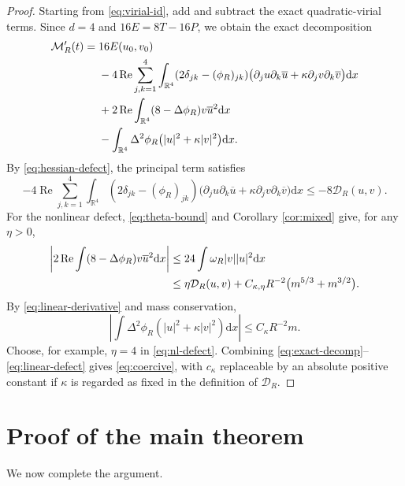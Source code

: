 \documentclass[10pt,a4paper]{amsart}
\numberwithin{equation}{section}
\newcommand{\R}{\mathbb{R}}
\newcommand{\dd}{\mathrm{d}x}
\newcommand{\re}{\operatorname{Re}}
\begin{document}
\begin{proof}
Starting from \eqref{eq:virial-id}, add and subtract the exact quadratic-virial terms.  Since $d=4$ and $16E=8T-16P$, we obtain the exact decomposition
\begin{align}
 \mathcal M_R'(t)
 ={}&16E(u_0,v_0)\label{eq:exact-decomp}\\
 &-4\re\sum_{j,k=1}^4\int_{\R^4}
 (2\delta_{jk}-(\phi_R)_{jk})
 \big(\partial_ju\partial_k\overline u+\kappa\partial_jv\partial_k\overline v\big)\dd\notag\\
 &+2\re\int_{\R^4}(8-\Delta\phi_R)v\overline u^{2}\dd\notag\\
 &-\int_{\R^4}\Delta^2\phi_R\big(|u|^2+\kappa|v|^2\big)\dd.\notag
\end{align}
By \eqref{eq:hessian-defect}, the principal term satisfies
\begin{equation}\label{eq:principal}
 -4\re\sum_{j,k=1}^4\int_{\R^4}
 (2\delta_{jk}-(\phi_R)_{jk})
 \big(\partial_ju\partial_k\overline u+\kappa\partial_jv\partial_k\overline v\big)\dd
 \le -8\mathcal D_R(u,v).
\end{equation}
For the nonlinear defect, \eqref{eq:theta-bound} and Corollary \ref{cor:mixed} give, for any $\eta>0$,
\begin{align}
 \left|2\re\int(8-\Delta\phi_R)v\overline u^{2}\dd\right|
 &\le24\int\omega_R|v||u|^2\dd\notag\\
 &\le \eta\mathcal D_R(u,v)
 +C_{\kappa,\eta}R^{-2}\big(m^{5/3}+m^{3/2}\big).
 \label{eq:nl-defect}
\end{align}
By \eqref{eq:linear-derivative} and mass conservation,
\begin{equation}\label{eq:linear-defect}
 \left|\int\Delta^2\phi_R(|u|^2+\kappa|v|^2)\dd\right|
 \le C_\kappa R^{-2}m.
\end{equation}
Choose, for example, $\eta=4$ in \eqref{eq:nl-defect}.  Combining \eqref{eq:exact-decomp}--\eqref{eq:linear-defect} gives \eqref{eq:coercive}, with $c_\kappa$ replaceable by an absolute positive constant if $\kappa$ is regarded as fixed in the definition of $\mathcal D_R$.
\end{proof}

\section{Proof of the main theorem}\label{sec:riccati}

We now complete the argument.
\end{document}
